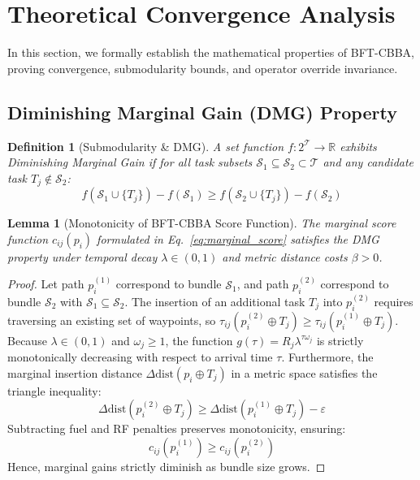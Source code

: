 \documentclass[journal,10pt,twocolumn]{IEEEtran}
\newtheorem{lemma}[theorem]{Lemma}
\newtheorem{definition}{Definition}
\begin{document}
\section{Theoretical Convergence Analysis}

In this section, we formally establish the mathematical properties of BFT-CBBA, proving convergence, submodularity bounds, and operator override invariance.

\subsection{Diminishing Marginal Gain (DMG) Property}
\begin{definition}[Submodularity & DMG]
A set function $f: 2^{\mathcal{T}} \to \mathbb{R}$ exhibits Diminishing Marginal Gain if for all task subsets $\mathcal{S}_1 \subseteq \mathcal{S}_2 \subset \mathcal{T}$ and any candidate task $T_j \notin \mathcal{S}_2$:
\begin{equation}
f(\mathcal{S}_1 \cup \{T_j\}) - f(\mathcal{S}_1) \ge f(\mathcal{S}_2 \cup \{T_j\}) - f(\mathcal{S}_2)
\end{equation}
\end{definition}

\begin{lemma}[Monotonicity of BFT-CBBA Score Function]
The marginal score function $c_{ij}(p_i)$ formulated in Eq.~\eqref{eq:marginal_score} satisfies the DMG property under temporal decay $\lambda \in (0, 1)$ and metric distance costs $\beta > 0$.
\end{lemma}
\begin{proof}
Let path $p_i^{(1)}$ correspond to bundle $\mathcal{S}_1$, and path $p_i^{(2)}$ correspond to bundle $\mathcal{S}_2$ with $\mathcal{S}_1 \subseteq \mathcal{S}_2$. The insertion of an additional task $T_j$ into $p_i^{(2)}$ requires traversing an existing set of waypoints, so $\tau_{ij}(p_i^{(2)} \oplus T_j) \ge \tau_{ij}(p_i^{(1)} \oplus T_j)$. Because $\lambda \in (0, 1)$ and $\omega_j \ge 1$, the function $g(\tau) = R_j \lambda^{\tau \omega_j}$ is strictly monotonically decreasing with respect to arrival time $\tau$. Furthermore, the marginal insertion distance $\Delta \text{dist}(p_i \oplus T_j)$ in a metric space satisfies the triangle inequality:
\begin{equation}
\Delta \text{dist}(p_i^{(2)} \oplus T_j) \ge \Delta \text{dist}(p_i^{(1)} \oplus T_j) - \varepsilon
\end{equation}
Subtracting fuel and RF penalties preserves monotonicity, ensuring:
\begin{equation}
c_{ij}(p_i^{(1)}) \ge c_{ij}(p_i^{(2)})
\end{equation}
Hence, marginal gains strictly diminish as bundle size grows.
\end{proof}
\end{document}
